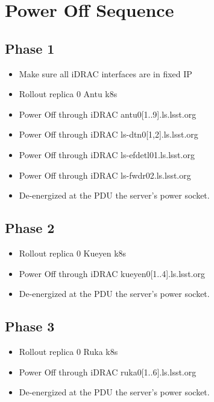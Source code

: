 \section{Power Off Sequence}
\subsection{Phase 1}
\begin{itemize}
  \item Make sure all iDRAC interfaces are in fixed IP
  \item Rollout replica 0 Antu k8s
  \item Power Off through iDRAC antu0[1..9].ls.lsst.org
  \item Power Off through iDRAC ls-dtn0[1,2].ls.lsst.org
  \item Power Off through iDRAC ls-efdetl01.ls.lsst.org
  \item Power Off through iDRAC ls-fwdr02.ls.lsst.org
  \item De-energized at the PDU the server's power socket.
\end{itemize}

\newpage
\subsection{Phase 2}
\begin{itemize}
  \item Rollout replica 0 Kueyen k8s
  \item Power Off through iDRAC kueyen0[1..4].ls.lsst.org
  \item De-energized at the PDU the server's power socket.
\end{itemize}

\newpage
\subsection{Phase 3}
\begin{itemize}
  \item Rollout replica 0 Ruka k8s 
  \item Power Off through iDRAC ruka0[1..6].ls.lsst.org
  \item De-energized at the PDU the server's power socket.
\end{itemize}

